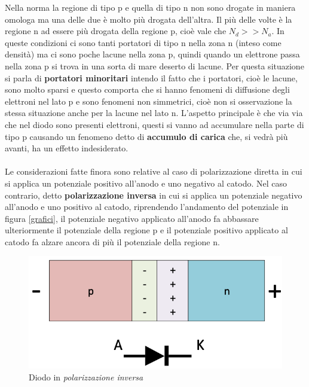 \documentclass[12pt, a4paper]{report}
\begin{document}
Nella norma la regione di tipo p e quella di tipo n non sono drogate in maniera omologa ma una delle due è molto più drogata dell'altra. Il più delle volte è la regione n ad essere più drogata della regione p, cioè vale che $N_{d} >> N_{a}$. In queste condizioni ci sono tanti portatori di tipo n nella zona n (inteso come densità) ma ci sono poche lacune nella zona p, quindi quando un elettrone passa nella zona p si trova in una sorta di mare deserto di lacune. Per questa situazione si parla di \textbf{portatori minoritari} intendo il fatto che i portatori, cioè le lacune, sono molto sparsi e questo comporta che si hanno fenomeni di diffusione degli elettroni nel lato p e sono fenomeni non simmetrici, cioè non si osservazione la stessa situazione anche per la lacune nel lato n. L'aspetto principale è che via via che nel diodo sono presenti elettroni, questi si vanno ad accumulare nella parte di tipo p causando un fenomeno detto di \textbf{accumulo di carica} che, si vedrà più avanti, ha un effetto indesiderato.
\\\\Le considerazioni fatte finora sono relative al caso di polarizzazione diretta in cui si applica un potenziale positivo all'anodo e uno negativo al catodo. Nel caso contrario, detto \textbf{polarizzazione inversa} in cui si applica un potenziale negativo all'anodo e uno positivo al catodo, riprendendo l'andamento del potenziale in figura \ref{grafici}, il potenziale negativo applicato all'anodo fa abbassare ulteriormente il potenziale della regione p e il potenziale positivo applicato al catodo fa alzare ancora di più il potenziale della regione n.
\begin{figure}[h]
\centering
\includegraphics[scale=0.4,angle=0]{diodo_polarizzazione_inversa.png}
\caption{Diodo in \textit{polarizzazione inversa}}
\end{figure}
\end{document}
